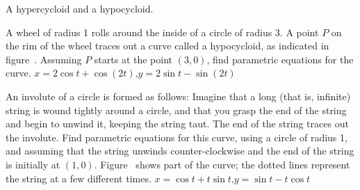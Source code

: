 \endtexonly
{}
\begincaption
A hypercycloid and a hypocycloid.
\endcaption
\endfigure

\endexercise

\exercise A wheel of radius 1 rolls around the inside of 
a circle of radius 3. A point $P$ on the rim of the wheel traces out a
curve called a {\dfont hypocycloid}, as indicated in
figure~. Assuming $P$
starts at the point $(3,0)$, find parametric equations for the curve.
\answer $x=2\cos t+\cos(2t)$,\hfill\break $y=2\sin t-\sin(2t)$
\endanswer
{}
\endexercise

\exercise An {\dfont involute} of a circle is formed
as follows: Imagine that a long (that is, infinite) string is wound tightly
around a circle, and that you grasp the end of the string and begin to
unwind it, keeping the string taut. The end of the string traces out
the involute. Find parametric equations for this curve, using a circle
of radius 1, and assuming that the string unwinds counter-clockwise
and the end of the string is initially at $(1,0)$. 
Figure~ shows part of the curve; the
dotted lines represent the string at a few different times.
\answer $x=\cos t+t\sin t$,\hfill\break  $y=\sin t-t\cos t$
\endanswer
{}


